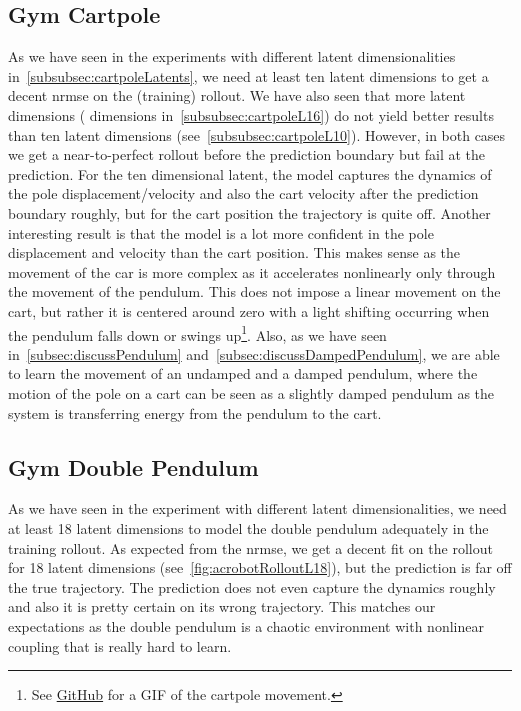 	\subsection{Gym Cartpole}
		As we have seen in the experiments with different latent dimensionalities in~\autoref{subsubsec:cartpoleLatents}, we need at least ten latent dimensions to get a decent \ac{nrmse} on the (training) rollout. We have also seen that more latent dimensions ( dimensions in~\autoref{subsubsec:cartpoleL16}) do not yield better results than ten latent dimensions (see~\autoref{subsubsec:cartpoleL10}). However, in both cases we get a near-to-perfect rollout before the prediction boundary but fail at the prediction. For the ten dimensional latent, the model captures the dynamics of the pole displacement/velocity and also the cart velocity after the prediction boundary roughly, but for the cart position the trajectory is quite off. Another interesting result is that the model is a lot more confident in the pole displacement and velocity than the cart position. This makes sense as the movement of the car is more complex as it accelerates nonlinearly only through the movement of the pendulum. This does not impose a linear movement on the cart, but rather it is centered around zero with a light shifting occurring when the pendulum falls down or swings up\footnote{See \href{https://github.com/fdamken/bachelors-thesis/blob/b5a4acbc1d10fa0224a73201995222690d2fb6de/thesis/figures/cartpole.gif}{GitHub} for a GIF of the cartpole movement.}. Also, as we have seen in~\autoref{subsec:discussPendulum} and~\autoref{subsec:discussDampedPendulum}, we are able to learn the movement of an undamped and a damped pendulum, where the motion of the pole on a cart can be seen as a slightly damped pendulum as the system is transferring energy from the pendulum to the cart.

	\subsection{Gym Double Pendulum}
		As we have seen in the experiment with different latent dimensionalities, we need at least 18 latent dimensions to model the double pendulum adequately in the training rollout. As expected from the \ac{nrmse}, we get a decent fit on the rollout for 18 latent dimensions (see~\autoref{fig:acrobotRolloutL18}), but the prediction is far off the true trajectory. The prediction does not even capture the dynamics roughly and also it is pretty certain on its wrong trajectory. This matches our expectations as the double pendulum is a chaotic environment with nonlinear coupling that is really hard to learn.

